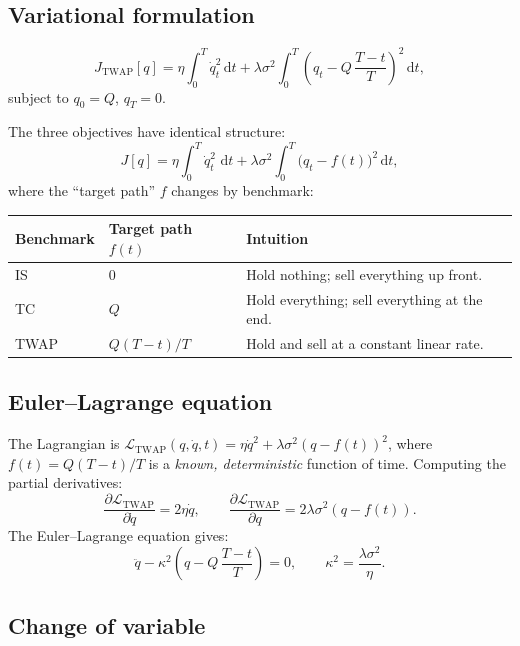\documentclass[12pt, a4paper]{article}
\newcommand{\dd}{\,\mathrm{d}}
\newcommand{\kap}{\kappa}
\begin{document}
\subsection{Variational formulation}

\begin{equation}
  J_{\mathrm{TWAP}}[q]
  = \eta\!\int_0^T \dot q_t^2 \dd t
    + \lambda\sigma^2\!\int_0^T \!\left(q_t - Q\,\frac{T-t}{T}\right)^{\!2} \dd t,
  \label{eq:JTWAP}
\end{equation}
subject to $q_0 = Q$, $q_T = 0$.

\begin{notebox}
The three objectives have identical structure:
\[
  J[q] = \eta\!\int_0^T\dot q_t^2\,\dd t + \lambda\sigma^2\!\int_0^T\bigl(q_t - f(t)\bigr)^2\dd t,
\]
where the ``target path'' $f$ changes by benchmark:
\begin{center}
  \renewcommand{\arraystretch}{1.4}
  \begin{tabular}{@{}lll@{}}
    \toprule
    Benchmark & Target path $f(t)$ & Intuition \\
    \midrule
    IS   & $0$              & Hold nothing; sell everything up front. \\
    TC   & $Q$              & Hold everything; sell everything at the end. \\
    TWAP & $Q(T-t)/T$  & Hold and sell at a constant linear rate. \\
    \bottomrule
  \end{tabular}
\end{center}
\end{notebox}

\subsection{Euler--Lagrange equation}

The Lagrangian is $\mathcal{L}_{\mathrm{TWAP}}(q,\dot q, t) = \eta\dot q^2 + \lambda\sigma^2(q - f(t))^2$,
where $f(t) = Q(T-t)/T$ is a \emph{known, deterministic} function of time.
Computing the partial derivatives:
\[
  \frac{\partial\mathcal{L}_{\mathrm{TWAP}}}{\partial\dot q} = 2\eta\dot q,
  \qquad
  \frac{\partial\mathcal{L}_{\mathrm{TWAP}}}{\partial q} = 2\lambda\sigma^2(q - f(t)).
\]
The Euler--Lagrange equation gives:
\[
  \ddot q - \kap^2\!\left(q - Q\,\frac{T-t}{T}\right) = 0, \qquad \kap^2 = \frac{\lambda\sigma^2}{\eta}.
\]

\subsection{Change of variable}
\end{document}
